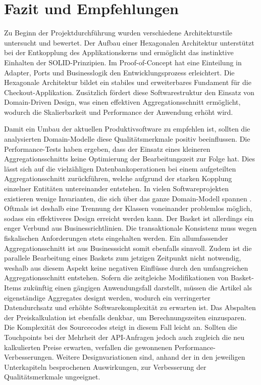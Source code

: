 

\chapter{Fazit und Empfehlungen}

Zu Beginn der Projektdurchführung wurden verschiedene Architekturstile untersucht und bewertet. Der Aufbau einer Hexagonalen Architektur unterstützt bei der Entkopplung des Applikationskerns und ermöglicht das instinktive Einhalten der SOLID-Prinzipien. Im Proof-of-Concept hat eine Einteilung in Adapter, Ports und Businesslogik den Entwicklungsprozess erleichtert. Die Hexagonale Architektur bildet ein stabiles und erweiterbares Fundament für die Checkout-Applikation. Zusätzlich fördert diese Softwarestruktur den Einsatz von Domain-Driven Design, was einen effektiven Aggregationsschnitt ermöglicht, wodurch die Skalierbarkeit und Performance der Anwendung erhöht wird. 

Damit ein Umbau der aktuellen Produktivsoftware zu empfehlen ist, sollten die analysierten Domain-Modelle diese Qualitätsmerkmale positiv beeinflussen. Die Performance-Tests haben ergeben, dass der Einsatz eines kleineren Aggregationsschnitts keine Optimierung der Bearbeitungszeit zur Folge hat. Dies lässt sich auf die vielzähligen Datenbankoperationen bei einem aufgeteilten Aggregationsschnitt zurückführen, welche aufgrund der starken Kopplung einzelner Entitäten untereinander entstehen. In vielen Softwareprojekten existieren wenige Invarianten, die sich über das ganze Domain-Modell spannen \cite[S. 355ff.]{Vernon.2015}. Oftmals ist deshalb eine Trennung der Klassen voneinander problemlos möglich, sodass ein effektiveres Design erreicht werden kann. Der Basket ist allerdings ein enger Verbund aus Businessrichtlinien. Die transaktionale Konsistenz muss wegen fiskalischen Anforderungen stets eingehalten werden. Ein allumfassender Aggregationsschnitt ist aus Businesssicht somit ebenfalls sinnvoll. Zudem ist die parallele Bearbeitung eines Baskets zum jetzigen Zeitpunkt nicht notwendig, weshalb aus diesem Aspekt keine negativen Einflüsse durch den umfangreichen Aggregationsschnitt entstehen. Sofern die zeitgleiche Modifikationen von Basket-Items zukünftig einen gängigen Anwendungsfall darstellt, müssen die Artikel als eigenständige Aggregates designt werden, wodurch ein verringerter Datendurchsatz und erhöhte Softwarekomplexität zu erwarten ist. Das Abspalten der Preiskalkulation ist ebenfalls denkbar, um Berechnungszeiten einzusparen. Die Komplexität des Sourcecodes steigt in diesem Fall leicht an. Sollten die Touchpoints bei der Mehrheit der API-Anfragen jedoch auch zugleich die neu kalkulierten Preise erwarten, verfallen die gewonnenen Performance-Verbesserungen. Weitere Designvariationen sind, anhand der in den jeweiligen Unterkapiteln besprochenen Auswirkungen, zur Verbesserung der Qualitätsmerkmale ungeeignet.

